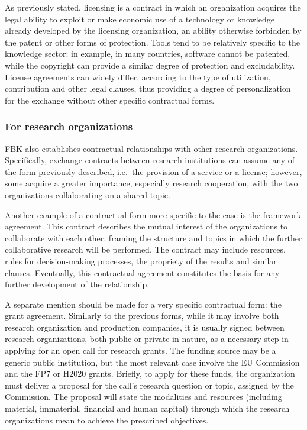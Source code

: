 As previously stated, licensing is a contract in which an organization acquires the legal ability to exploit or make economic use of a technology or knowledge already developed by the licensing organization, an ability otherwise forbidden by the patent or other forms of protection. Tools tend to be relatively specific to the knowledge sector: in example, in many countries, software cannot be patented, while the copyright can provide a similar degree of protection and excludability. License agreements can widely differ, according to the type of utilization, contribution and other legal clauses, thus providing a degree of personalization for the exchange without other specific contractual forms.

\subsubsection{For research organizations}

FBK also establishes contractual relationships with other research organizations. Specifically, exchange contracts between research institutions can assume any of the form previously described, i.e.\ the provision of a service or a license; however, some acquire a greater importance, especially research cooperation, with the two organizations collaborating on a shared topic.

Another example of a contractual form more specific to the case is the framework agreement. This contract describes the mutual interest of the organizations to collaborate with each other, framing the structure and topics in which the further collaborative research will be performed. The contract may include resources, rules for decision-making processes, the propriety of the results and similar clauses. Eventually, this contractual agreement constitutes the basis for any further development of the relationship.

A separate mention should be made for a very specific contractual form: the grant agreement. Similarly to the previous forms, while it may involve both research organization and production companies, it is usually signed between research organizations, both public or private in nature, as a necessary step in applying for an open call for research grants. The funding source may be a generic public institution, but the most relevant case involve the EU Commission and the FP7 or H2020 grants. Briefly, to apply for these funds, the organization must deliver a proposal for the call's research question or topic, assigned by the Commission. The proposal will state the modalities and resources (including material, immaterial, financial and human capital) through which the research organizations mean to achieve the prescribed objectives.

